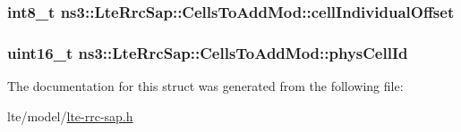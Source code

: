 \subsubsection[{\texorpdfstring{cell\+Individual\+Offset}{cellIndividualOffset}}]{\setlength{\rightskip}{0pt plus 5cm}int8\+\_\+t ns3\+::\+Lte\+Rrc\+Sap\+::\+Cells\+To\+Add\+Mod\+::cell\+Individual\+Offset}\hypertarget{structns3_1_1LteRrcSap_1_1CellsToAddMod_a735203ed0992b79612612429c657f21f}{}\label{structns3_1_1LteRrcSap_1_1CellsToAddMod_a735203ed0992b79612612429c657f21f}
\subsubsection[{\texorpdfstring{phys\+Cell\+Id}{physCellId}}]{\setlength{\rightskip}{0pt plus 5cm}uint16\+\_\+t ns3\+::\+Lte\+Rrc\+Sap\+::\+Cells\+To\+Add\+Mod\+::phys\+Cell\+Id}\hypertarget{structns3_1_1LteRrcSap_1_1CellsToAddMod_af464d86622df4ae8343121a1ef229b66}{}\label{structns3_1_1LteRrcSap_1_1CellsToAddMod_af464d86622df4ae8343121a1ef229b66}


The documentation for this struct was generated from the following file\+:\begin{DoxyCompactItemize}
\item 
lte/model/\hyperlink{lte-rrc-sap_8h}{lte-\/rrc-\/sap.\+h}\end{DoxyCompactItemize}
